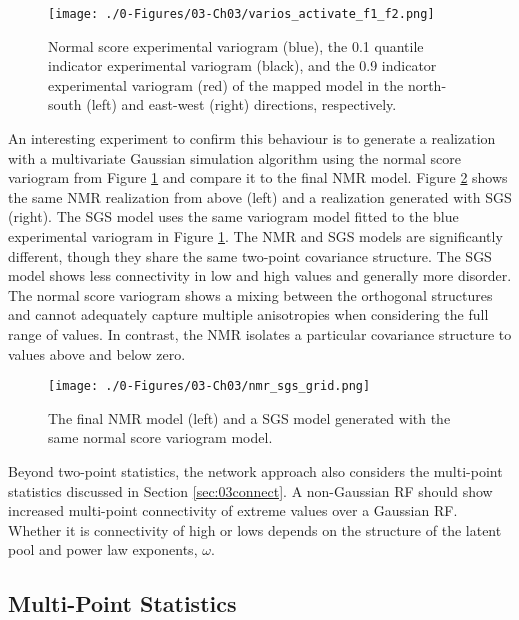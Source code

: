 \begin{figure}[htb!]
    \centering
    \texttt{[image: ./0-Figures/03-Ch03/varios\_activate\_f1\_f2.png]}
    \caption{Normal score experimental variogram (blue), the 0.1 quantile indicator experimental variogram (black), and the 0.9 indicator experimental variogram (red) of the mapped model in the north-south (left) and east-west (right) directions, respectively.}
    \label{fig:varios_activate_f1_f2}
\end{figure}

An interesting experiment to confirm this behaviour is to generate a realization with a multivariate Gaussian simulation algorithm using the normal score variogram from Figure \ref{fig:varios_activate_f1_f2} and compare it to the final \gls{NMR} model. Figure \ref{fig:nmr_sgs_grid} shows the same \gls{NMR} realization from above (left) and a realization generated with \gls{SGS} (right). The \gls{SGS} model uses the same variogram model fitted to the blue experimental variogram in Figure \ref{fig:varios_activate_f1_f2}. The \gls{NMR} and \gls{SGS} models are significantly different, though they share the same two-point covariance structure. The \gls{SGS} model shows less connectivity in low and high values and generally more disorder. The normal score variogram shows a mixing between the orthogonal structures and cannot adequately capture multiple anisotropies when considering the full range of values. In contrast, the \gls{NMR} isolates a particular covariance structure to values above and below zero.

\begin{figure}[htb!]
    \centering
    \texttt{[image: ./0-Figures/03-Ch03/nmr\_sgs\_grid.png]}
    \caption{ The final \gls{NMR} model (left) and a \gls{SGS} model generated with the same normal score variogram model. }
    \label{fig:nmr_sgs_grid}
\end{figure}

Beyond two-point statistics, the network approach also considers the multi-point statistics discussed in Section \ref{sec:03connect}. A non-Gaussian \gls{RF} should show increased multi-point connectivity of extreme values over a Gaussian \gls{RF}. Whether it is connectivity of high or lows depends on the structure of the latent pool and power law exponents, $\omega$.


\FloatBarrier
\subsection{Multi-Point Statistics}
\label{subsec:03multipt}


